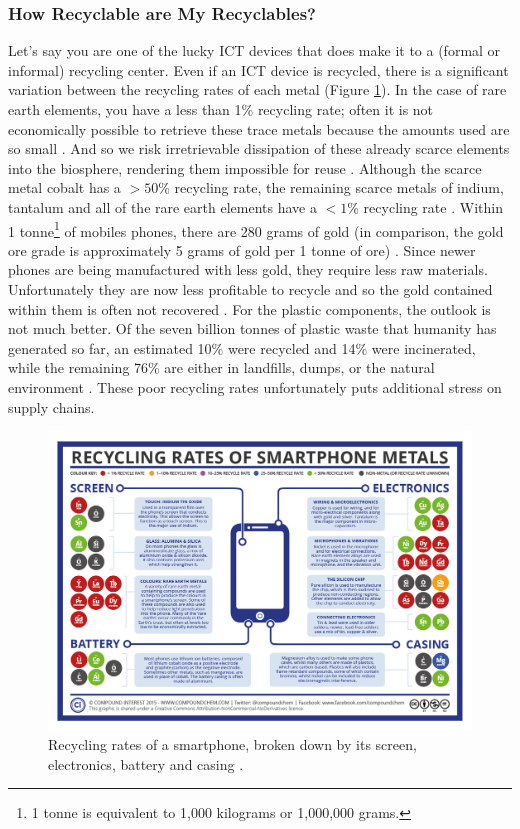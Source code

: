 \documentclass{article}
\begin{document}
\subsubsection{How Recyclable are My Recyclables?}
Let's say you are one of the lucky ICT devices that does make it to a (formal or informal) recycling center. Even if an ICT device is recycled, there is a significant variation between the recycling rates of each metal (Figure \ref{Recycling_Rates_Smartphone}). In the case of rare earth elements, you have a less than 1\% recycling rate; often it is not economically possible to retrieve these trace metals because the amounts used are so small \cite{physorg2012scarcemetals, habib2015tracking}. And so we risk irretrievable dissipation of these already scarce elements into the biosphere, rendering them impossible for reuse \cite{reller2009mobile}. Although the scarce metal cobalt has a $>50\%$ recycling rate, the remaining scarce metals of indium, tantalum and all of the rare earth elements have a $<1\%$ recycling rate \cite{compoundinterest2014}. Within 1 tonne\footnote{1 tonne is equivalent to 1,000 kilograms or 1,000,000 grams.} of mobiles phones, there are 280 grams of gold \cite{forti2020global} (in comparison, the gold ore grade is approximately 5 grams of gold per 1 tonne of ore) \cite{mudd2007sustainability}. Since newer phones are being manufactured with less gold, they require less raw materials. Unfortunately they are now less profitable to recycle and so the gold contained within them is often not recovered \cite{geyer2010economics}. For the plastic components, the outlook is not much better. Of the seven billion tonnes of plastic waste that humanity has generated so far, an estimated 10\% were recycled and 14\% were incinerated, while the remaining 76\% are either in landfills, dumps, or the natural environment \cite{geyer2020production}. These poor recycling rates unfortunately puts additional stress on supply chains.

\begin{figure}[h]
    \includegraphics[width=1 \textwidth]{./images/recycling_rates_of_smartphone.png}
    \centering
    \caption{Recycling rates of a smartphone, broken down by its screen, electronics, battery and casing \cite{compoundinterest2014}.}
    \label{Recycling_Rates_Smartphone}
\end{figure}
\end{document}
